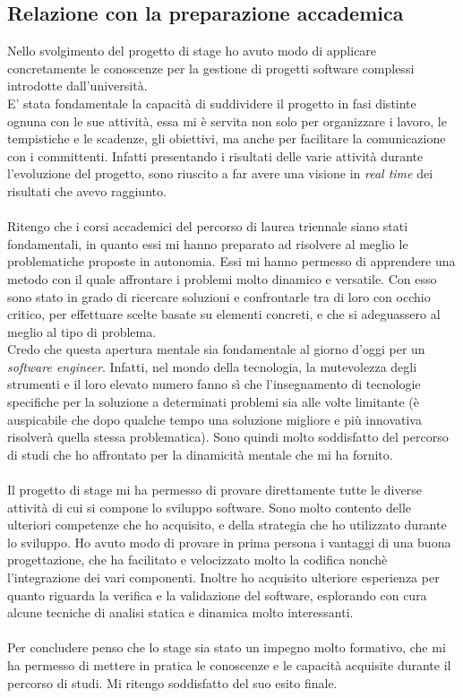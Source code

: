 \subsection{Relazione con la preparazione accademica}
Nello svolgimento del progetto di stage ho avuto modo di applicare concretamente le conoscenze per la gestione di progetti software complessi introdotte dall'università. \\
E' stata fondamentale la capacità di suddividere il progetto in fasi distinte ognuna con le sue attività, essa mi è servita non solo per organizzare i lavoro, le tempistiche e le scadenze, gli obiettivi, ma anche per facilitare la comunicazione con i committenti. Infatti presentando i risultati delle varie attività durante l'evoluzione del progetto, sono riuscito a far avere una visione in \textit{real time} dei risultati che avevo raggiunto. \\ \\ 
Ritengo che i corsi accademici del percorso di laurea triennale siano stati fondamentali, in quanto essi mi hanno preparato ad risolvere al meglio le problematiche proposte in autonomia. Essi mi hanno permesso di apprendere una metodo con il quale affrontare i problemi molto dinamico e versatile. Con esso sono stato in grado di ricercare soluzioni e confrontarle tra di loro con occhio critico, per effettuare scelte basate su elementi concreti, e che si adeguassero al meglio al tipo di problema. \\
Credo che questa apertura mentale sia fondamentale al giorno d'oggi per un \textit{software engineer}. Infatti, nel mondo della tecnologia, la mutevolezza degli strumenti e il loro elevato numero fanno sì che l'insegnamento di tecnologie specifiche per la soluzione a determinati problemi sia alle volte limitante (è auspicabile che dopo qualche tempo una soluzione migliore e più innovativa risolverà quella stessa problematica). Sono quindi molto soddisfatto del percorso di studi che ho affrontato per la dinamicità mentale che mi ha fornito. \\ \\
Il progetto di stage mi ha permesso di provare direttamente tutte le diverse attività di cui si compone lo sviluppo software. Sono molto contento delle ulteriori competenze che ho acquisito, e della strategia che ho utilizzato durante lo sviluppo. Ho avuto modo di provare in prima persona i vantaggi di una buona progettazione, che ha facilitato e velocizzato molto la codifica nonchè l'integrazione dei vari componenti. Inoltre ho acquisito ulteriore esperienza per quanto riguarda la verifica e la validazione del software, esplorando con cura alcune tecniche di analisi statica e dinamica molto interessanti. \\ \\ 
Per concludere penso che lo stage sia stato un impegno molto formativo, che mi ha permesso di mettere in pratica le conoscenze e le capacità acquisite durante il percorso di studi. Mi ritengo soddisfatto del suo esito finale.
